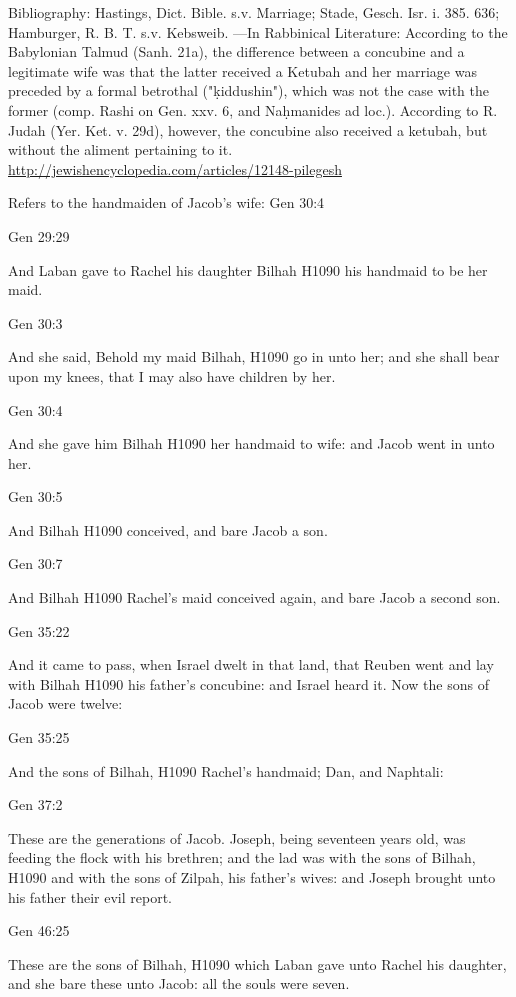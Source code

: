 \documentclass[11pt]{article}
\begin{document}
{Bibliography:
Hastings, Dict. Bible. s.v. Marriage;
Stade, Gesch. Isr. i. 385. 636;
Hamburger, R. B. T. s.v. Kebsweib.
—In Rabbinical Literature:
According to the Babylonian Talmud (Sanh. 21a), the difference between a concubine and a legitimate wife was that the latter received a Ketubah and her marriage was preceded by a formal betrothal ("ḳiddushin"), which was not the case with the former (comp. Rashi on Gen. xxv. 6, and Naḥmanides ad loc.). According to R. Judah (Yer. Ket. v. 29d), however, the concubine also received a ketubah, but without the aliment pertaining to it.
\url{http://jewishencyclopedia.com/articles/12148-pilegesh}

Refers to the handmaiden of Jacob's wife:
Gen 30:4



Gen 29:29

And Laban gave to Rachel his daughter Bilhah H1090 his handmaid to be her maid.


Gen 30:3

And she said, Behold my maid Bilhah, H1090 go in unto her; and she shall bear upon my knees, that I may also have children by her.


Gen 30:4

And she gave him Bilhah H1090 her handmaid to wife: and Jacob went in unto her.


Gen 30:5

And Bilhah H1090 conceived, and bare Jacob a son.


Gen 30:7

And Bilhah H1090 Rachel's maid conceived again, and bare Jacob a second son.


Gen 35:22

And it came to pass, when Israel dwelt in that land, that Reuben went and lay with Bilhah H1090 his father's concubine: and Israel heard it. Now the sons of Jacob were twelve:


Gen 35:25

And the sons of Bilhah, H1090 Rachel's handmaid; Dan, and Naphtali:



Gen 37:2

These are the generations of Jacob. Joseph, being seventeen years old, was feeding the flock with his brethren; and the lad was with the sons of Bilhah, H1090 and with the sons of Zilpah, his father's wives: and Joseph brought unto his father their evil report.


Gen 46:25

These are the sons of Bilhah, H1090 which Laban gave unto Rachel his daughter, and she bare these unto Jacob: all the souls were seven.


}
\end{document}
